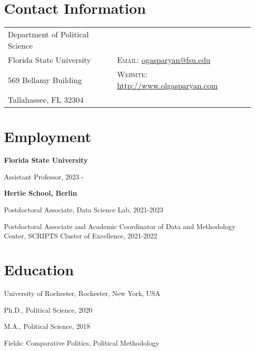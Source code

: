 \documentclass[margin,line,10.95pt]{res}
\newenvironment{list1}{
  \begin{list}{\ding{113}}{%
      \setlength{\itemsep}{0in}
      \setlength{\parsep}{0in} \setlength{\parskip}{0in}
      \setlength{\topsep}{0in} \setlength{\partopsep}{0in}
      \setlength{\leftmargin}{0.17in}}}{\end{list}}
\begin{document}

\begin{resume}
\section{\sc Contact Information}
\vspace{.05in}
\begin{tabular}{@{}p{2.5in}p{4in}}
Department of Political Science            &  \\
Florida State University  & \textsc{Email}: \href{mailto:ogasparyan@fsu.edu}{ogasparyan@fsu.edu} \\
569 Bellamy Building & \textsc{Website}: \href{http://www.olgasparyan.com}{http://www.olgasparyan.com} \\
Tallahassee, FL 32304     \\
\end{tabular}

\section{\sc Employment}
{\textbf{Florida State University}}\\
\vspace*{-.1in}
\begin{list1}
	\item[] Assistant Professor, 2023 -

\end{list1}


\textbf{Hertie School, Berlin}\\
\vspace*{-.1in}
\begin{list1}
	\item[] Postdoctoral Associate, Data Science Lab, 2021-2023
	\item[] Postdoctoral Associate and Academic Coordinator of Data and Methodology Center, SCRIPTS Cluster of Excellence, 2021-2022

\end{list1}

\section{\sc Education}
{University of Rochester}, Rochester, New York, USA\\
\vspace*{-.1in}
\begin{list1}
\item[] Ph.D., Political Science, 2020 
\item[] M.A., Political Science, 2018 
\item[] Fields: Comparative Politics, Political Methodology 
\end{list1}


\end{resume}
\end{document}
